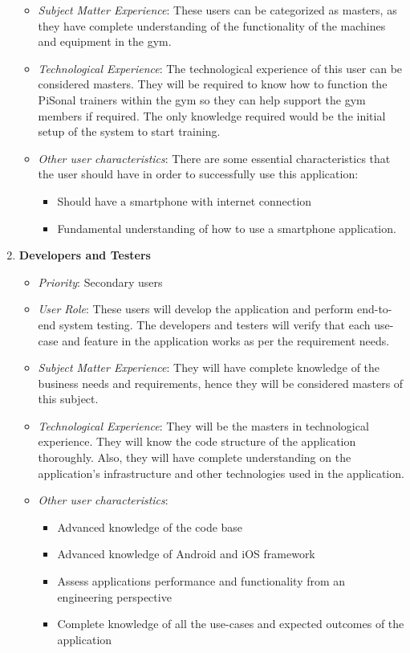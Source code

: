 \documentclass{article}
\begin{document}
\begin{enumerate}
\begin{itemize}
    \item \textit{Subject Matter Experience}: These users can be categorized as masters, as they have complete understanding of the functionality of the machines and equipment in the gym.
 
    \item \textit{Technological Experience}: The technological experience of this user can be considered masters. They will be required to know how to function the PiSonal trainers within the gym so they can help support the gym members if required. The only knowledge required would be the initial setup of the system to start training.
 
    \item \textit{Other user characteristics}: There are some essential characteristics that the user should have in order to successfully use this application:
    \begin{itemize}
        \item Should have a smartphone with internet connection
        \item Fundamental understanding of how to use a smartphone application.
    \end{itemize}
    \end{itemize}
    
    \item \textbf{Developers and Testers}
    \begin{itemize}
    \item \textit{Priority}: Secondary users
    \item \textit{User Role}: These users will develop the application and perform end-to-end system testing. The developers and testers will verify that each use-case and feature in the application works as per the requirement needs.
 
    \item \textit{Subject Matter Experience}: They will have complete knowledge of the business needs and requirements, hence they will be considered masters of this subject.
 
    \item \textit{Technological Experience}: They will be the masters in technological experience. They will know the code structure of the application thoroughly. Also, they will have complete understanding on the application’s infrastructure and other technologies used in the application.
 
    \item \textit{Other user characteristics}:
    \begin{itemize}
        \item Advanced knowledge of the code base
        \item Advanced knowledge of Android and iOS framework
        \item Assess applications performance and functionality from an engineering perspective
        \item Complete knowledge of all the use-cases and expected outcomes of the application
    \end{itemize}
    \end{itemize}
\end{enumerate}
\end{document}
